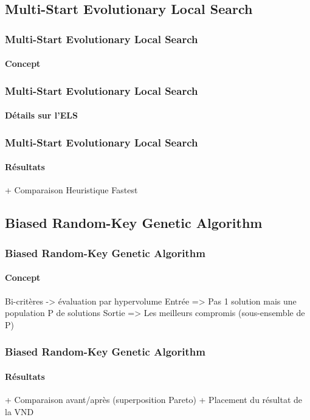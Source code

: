 \subsection{Multi-Start Evolutionary Local Search}
\begin{frame}
	\frametitle{Multi-Start Evolutionary Local Search}
	\framesubtitle{Concept}
\end{frame}
\begin{frame}
	\frametitle{Multi-Start Evolutionary Local Search}
	\framesubtitle{Détails sur l'ELS}
\end{frame}
\begin{frame}
	\frametitle{Multi-Start Evolutionary Local Search}
	\framesubtitle{Résultats}
	+ Comparaison Heuristique Fastest
\end{frame}

\subsection{Biased Random-Key Genetic Algorithm}
\begin{frame}
	\frametitle{Biased Random-Key Genetic Algorithm}
	\framesubtitle{Concept}
	Bi-critères -> évaluation par hypervolume
	Entrée => Pas 1 solution mais une population P de solutions
	Sortie => Les meilleurs compromis (sous-ensemble de P)
\end{frame}
\begin{frame}
	\frametitle{Biased Random-Key Genetic Algorithm}
	\framesubtitle{Résultats}
	+ Comparaison avant/après (superposition Pareto)
	+ Placement du résultat de la VND
\end{frame}